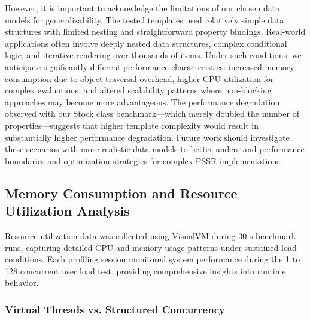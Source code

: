 \documentclass[software,article,accept,pdftex,moreauthors]{Definitions/mdpi}
\begin{document}
However, it is important to acknowledge the limitations of our chosen data
models for generalizability. The tested templates used relatively simple data
structures with limited nesting and straightforward property bindings.
Real-world applications often involve deeply nested data structures, complex
conditional logic, and iterative rendering over thousands of items. Under such
conditions, we anticipate significantly different performance characteristics:
increased memory consumption due to object traversal overhead, higher CPU
utilization for complex evaluations, and altered scalability patterns where
non-blocking approaches may become more advantageous. The performance
degradation observed with our Stock class benchmark---which merely doubled the
number of properties---suggests that higher template complexity would result in
substantially higher performance degradation. Future work should investigate
these scenarios with more realistic data models to better understand
performance boundaries and optimization strategies for complex PSSR
implementations.

\subsection{Memory Consumption and Resource Utilization Analysis}
\label{sec:memory-analysis}


Resource utilization data was collected using VisualVM during 30 s benchmark runs, capturing detailed CPU and memory usage patterns under
sustained load conditions. Each profiling session monitored system performance
during the 1 to 128 concurrent user load test, providing comprehensive insights
into runtime behavior.

\subsubsection*{Virtual Threads vs. Structured Concurrency}
\end{document}
